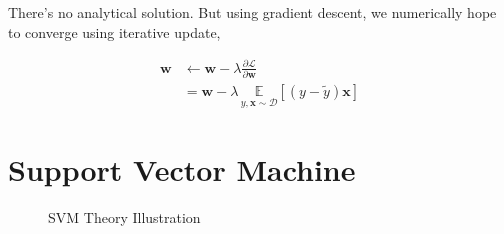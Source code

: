 \documentclass[11pt]{article}
\begin{document}
There’s no analytical solution.  But using gradient
descent, we numerically hope to converge using
iterative update,

\begin{align*}
  \mathbf{w} &\gets \mathbf{w} -\lambda \frac {\partial
               \mathcal{L}} {\partial \mathbf{w}} \\
  &= \mathbf{w} -\lambda \, \underset{y, \mathbf{x}
    \sim \mathcal{D}} {\mathbb{E}} \left[
    (y-\widetilde{y}) \mathbf{x} \right] 
\end{align*}

\section{Support Vector Machine}
\label{sec:orgccaa349}

\begin{figure}[!h]
\LARGE
\centering
\def\svgwidth{0.8\linewidth}

\caption{SVM Theory Illustration}
\end{figure}
\end{document}
